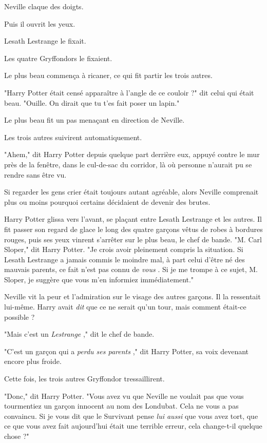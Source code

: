 Neville claque des doigts.

Puis il ouvrit les yeux.

Lesath Lestrange le fixait.

Les quatre Gryffondors le fixaient.

Le plus beau commença à ricaner, ce qui fit partir les trois autres.

"Harry Potter était censé apparaître à l'angle de ce couloir ?" dit celui qui était beau. "Ouille. On dirait que tu t'es fait poser un lapin."

Le plus beau fit un pas menaçant en direction de Neville.

Les trois autres suivirent automatiquement.

"Ahem," dit Harry Potter depuis quelque part derrière eux, appuyé contre le mur près de la fenêtre, dans le cul-de-sac du corridor, là où personne n'aurait pu se rendre sans être vu.

Si regarder les gens crier était toujours autant agréable, alors Neville comprenait plus ou moins pourquoi certains décidaient de devenir des brutes.

Harry Potter glissa vers l'avant, se plaçant entre Lesath Lestrange et les autres. Il fit passer son regard de glace le long des quatre garçons vêtus de robes à bordures rouges, puis ses yeux vinrent s'arrêter sur le plus beau, le chef de bande. "M. Carl Sloper," dit Harry Potter. "Je crois avoir pleinement compris la situation. Si Lesath Lestrange a jamais commis le moindre mal, à part celui d'être né des mauvais parents, ce fait n'est pas connu de \emph{vous} . Si je me trompe à ce sujet, M. Sloper, je suggère que vous m'en informiez immédiatement."

Neville vit la peur et l'admiration sur le visage des autres garçons. Il la ressentait lui-même. Harry avait \emph{dit}  que ce ne serait qu'un tour, mais comment était-ce possible ?

"Mais c'est un \emph{Lestrange} ," dit le chef de bande.

"C'est un garçon qui a\emph{ perdu ses parents} ," dit Harry Potter, sa voix devenant encore plus froide.

Cette fois, les trois autres Gryffondor tressaillirent.

"Donc," dit Harry Potter. "Vous avez vu que Neville ne voulait pas que vous tourmentiez un garçon innocent au nom des Londubat. Cela ne vous a pas convaincu. Si je vous dit que le Survivant pense \emph{lui aussi}  que vous avez tort, que ce que vous avez fait aujourd'hui était une terrible erreur, cela change-t-il quelque chose ?"

